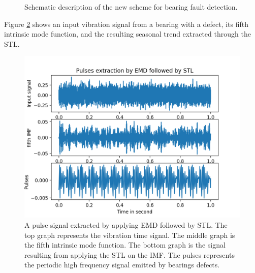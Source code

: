\documentclass[../Main/thesis.tex]{subfiles}
\begin{document}
\begin{figure}[H]
  \caption{Schematic description of the new scheme for bearing fault detection.}
   \label{fig:pulse}
\end{figure}
   
\justify
Figure \ref{fig:emd-stl} shows an input vibration signal from a bearing with a defect, its fifth intrinsic mode function, and the resulting seasonal trend extracted through the STL.

\begin{figure}[H] %
   \centering
   \includegraphics[width=6in]{../fig/emd-stl.png} 
   \caption{ A pulse signal extracted by applying EMD followed by STL. The top graph represents the vibration time signal. The middle graph is the fifth intrinsic mode function. The bottom graph is the signal resulting from applying the STL on the IMF. The pulses represents the periodic high frequency signal emitted by bearings defects.}
   \label{fig:emd-stl}
\end{figure}
\justify
\end{document}
